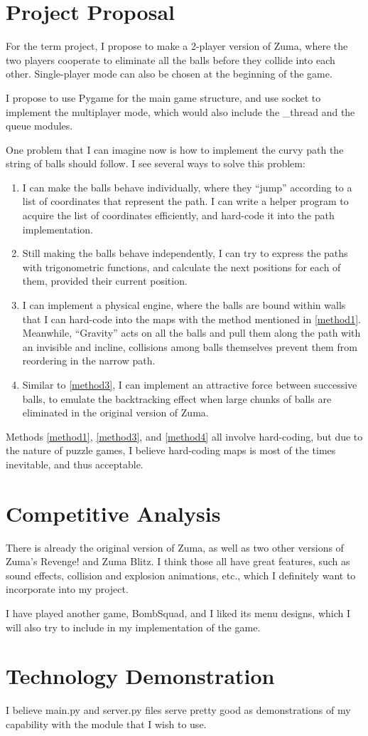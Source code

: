 \documentclass[letterpaper]{article}
\begin{document}
\section{Project Proposal}
For the term project, I propose to make a 2-player version of Zuma, where the two players cooperate to eliminate all the balls before they collide into each other. Single-player mode can also be chosen at the beginning of the game.

I propose to use Pygame for the main game structure, and use socket to implement the multiplayer mode, which would also include the \_thread and the queue modules.

One problem that I can imagine now is how to implement the curvy path the string of balls should follow. I see several ways to solve this problem:
\begin{enumerate}
\item\label{method1}I can make the balls behave individually, where they ``jump'' according to a list of coordinates that represent the path. I can write a helper program to acquire the list of coordinates efficiently, and hard-code it into the path implementation.
\item Still making the balls behave independently, I can try to express the paths with trigonometric functions, and calculate the next positions for each of them, provided their current position.
\item\label{method3}I can implement a physical engine, where the balls are bound within walls that I can hard-code into the maps with the method mentioned in \ref{method1}. Meanwhile, ``Gravity'' acts on all the balls and pull them along the path with an invisible and incline, collisions among balls themselves prevent them from reordering in the narrow path.
\item\label{method4}Similar to \ref{method3}, I can implement an attractive force between successive balls, to emulate the backtracking effect when large chunks of balls are eliminated in the original version of Zuma.
\end{enumerate}

Methods \ref{method1}, \ref{method3}, and \ref{method4} all involve hard-coding, but due to the nature of puzzle games, I believe hard-coding maps is most of the times inevitable, and thus acceptable.
\section{Competitive Analysis}
There is already the original version of Zuma, as well as two other versions of Zuma's Revenge! and Zuma Blitz. I think those all have great features, such as sound effects, collision and explosion animations, etc., which I definitely want to incorporate into my project.

I have played another game, BombSquad, and I liked its menu designs, which I will also try to include in my implementation of the game.
\section{Technology Demonstration}
I believe main.py and server.py files serve pretty good as demonstrations of my capability with the module that I wish to use.
\end{document}
